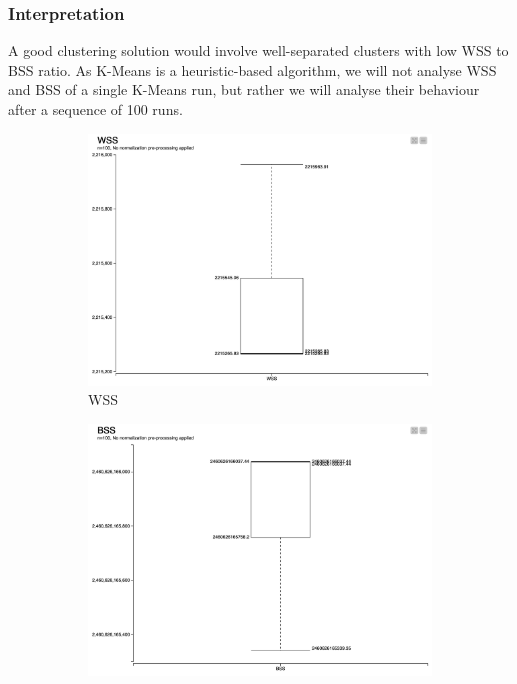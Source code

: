 \documentclass[11pt]{article}
\begin{document}
			\subsubsection*{Interpretation}
				A good clustering solution would involve well-separated clusters with low WSS to BSS ratio\cite{7}. As K-Means is a heuristic-based algorithm, we will not analyse WSS and BSS of a single K-Means run, but rather we will analyse their behaviour after a sequence of 100 runs. 
				\iffalse
				\begin{figure}[H]
					
					\centering
					\begin{subfigure}{0.4\textwidth}
						\includegraphics[width=\textwidth]{res/t1/t15/t15-WSS-plot}
						\caption{WSS}
						\label{fig:first}
					\end{subfigure}
					\hfill
					\begin{subfigure}{0.4\textwidth}
						\includegraphics[width=\textwidth]{res/t1/t15/t15-BSS-plot}

\end{subfigure}
\end{figure}
\end{document}
